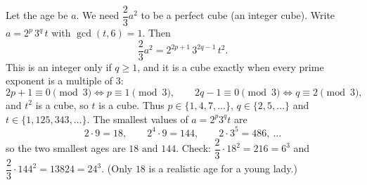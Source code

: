 Let the age be $a$. We need $\dfrac{2}{3}a^2$ to be a perfect cube (an integer cube). Write $a=2^p\,3^q\,t$ with $\gcd(t,6)=1$. Then
\[
\dfrac{2}{3}a^2=2^{2p+1}\,3^{2q-1}\,t^2 .
\]
This is an integer only if $q\ge1$, and it is a cube exactly when every prime exponent is a multiple of $3$:
\[
2p+1\equiv0\pmod3\iff p\equiv1\pmod3,\qquad 2q-1\equiv0\pmod3\iff q\equiv2\pmod3,
\]
and $t^2$ is a cube, so $t$ is a cube. Thus $p\in\{1,4,7,\dots\}$, $q\in\{2,5,\dots\}$ and $t\in\{1,125,343,\dots\}$. The smallest values of $a=2^p3^qt$ are
\[
2\cdot9=18,\qquad 2^4\cdot9=144,\qquad 2\cdot3^5=486,\ \dots
\]
so the two smallest ages are $\boxed{18\text{ and }144}$. Check: $\dfrac{2}{3}\cdot18^2=216=6^3$ and $\dfrac{2}{3}\cdot144^2=13824=24^3$. (Only $18$ is a realistic age for a young lady.)
